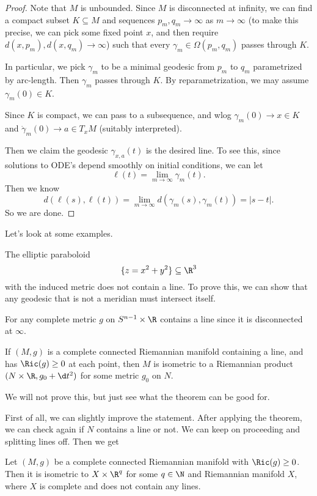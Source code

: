 \documentclass[a4paper]{article}
\begin{document}
\begin{proof}
  Note that $M$ is unbounded. Since $M$ is disconnected at infinity, we can find a compact subset $K \subseteq M$ and sequences $p_m, q_m \to \infty$ as $m \to \infty$ (to make this precise, we can pick some fixed point $x$, and then require $d(x, p_m), d(x, q_m) \to \infty$) such that every $\gamma_m \in \Omega(p_m, q_m)$ passes through $K$.

  In particular, we pick $\gamma_m$ to be a minimal geodesic from $p_m$ to $q_m$ parametrized by arc-length. Then $\gamma_m$ passes through $K$. By reparametrization, we may assume $\gamma_m(0) \in K$.

  Since $K$ is compact, we can pass to a subsequence, and wlog $\gamma_m(0) \to x \in K$ and $\dot{\gamma}_m(0) \to a \in T_xM$ (suitably interpreted).

  Then we claim the geodesic $\gamma_{x, a}(t)$ is the desired line. To see this, since solutions to ODE's depend smoothly on initial conditions, we can let
  \[
    \ell(t) = \lim_{m \to \infty} \gamma_m(t).
  \]
  Then we know
  \[
    d(\ell(s), \ell(t)) = \lim_{m \to \infty} d(\gamma_m(s), \gamma_m(t)) = |s - t|.
  \]
  So we are done.
\end{proof}

Let's look at some examples.
\begin{eg}
  The elliptic paraboloid
  \[
    \{z = x^2 + y^2\} \subseteq \R^3
  \]
  with the induced metric does not contain a line. To prove this, we can show that any geodesic that is not a meridian must intersect itself.
\end{eg}

\begin{eg}
  For any complete metric $g$ on $S^{n - 1} \times \R$ contains a line since it is disconnected at $\infty$.
\end{eg}

\begin{thm}
  If $(M, g)$ is a complete connected Riemannian manifold containing a line, and has $\Ric(g) \geq 0$ at each point, then $M$ is isometric to a Riemannian product $(N \times \R, g_0 + \d t^2)$ for some metric $g_0$ on $N$.
\end{thm}
We will not prove this, but just see what the theorem can be good for.

First of all, we can slightly improve the statement. After applying the theorem, we can check again if $N$ contains a line or not. We can keep on proceeding and splitting lines off. Then we get
\begin{cor}
  Let $(M, g)$ be a complete connected Riemannian manifold with $\Ric(g) \geq 0$. Then it is isometric to $X \times \R^q$ for some $q \in \N$ and Riemannian manifold $X$, where $X$ is complete and does not contain any lines.
\end{cor}
\end{document}
